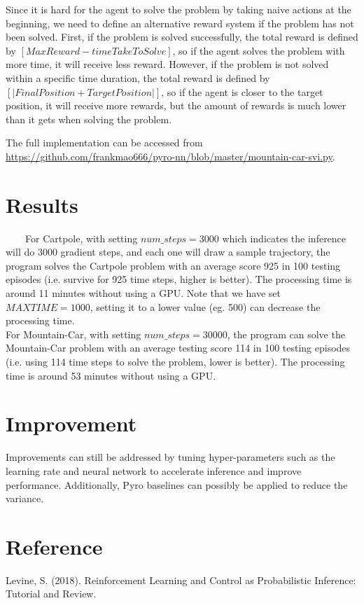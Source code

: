 \documentclass[acmsmall,nonacm=true]{acmart}
\begin{document}
Since it is hard for the agent to solve the problem by taking naive actions at the beginning, we need to define an alternative reward system if the problem has not been solved. First, if the problem is solved successfully, the total reward is defined by $[MaxReward - timeTakeToSolve]$, so if the agent solves the problem with more time, it will receive less reward. However, if the problem is not solved within a specific time duration, the total reward is defined by $[|FinalPosition + TargetPosition|]$, so if the agent is closer to the target position, it will receive more rewards, but the amount of rewards is much lower than it gets when solving the problem.

The full implementation can be accessed from  \url{https://github.com/frankmao666/pyro-nn/blob/master/mountain-car-svi.py}.
\section{Results}

\ \ \ \ For Cartpole, with setting 
$num\_steps = 3000$
which indicates the inference will do 3000 gradient steps, and each one will draw a sample trajectory, the program solves the Cartpole problem with an average  score 925 in 100 testing episodes (i.e. survive for 925 time steps, higher is better). The processing time is around 11 minutes without using a GPU. Note that we have set $MAXTIME = 1000$, setting it to a lower value (eg. 500) can decrease the processing time. \\


For Mountain-Car, with setting 
$num\_steps = 30000$,
the program can solve the Mountain-Car problem with an average testing score 114 in 100 testing episodes (i.e. using 114 time steps to solve the problem, lower is better). The processing time is around 53 minutes without using a GPU.

\section{Improvement}

Improvements can still be addressed by tuning  hyper-parameters such as the learning rate and  neural network to accelerate inference and improve performance. Additionally, Pyro baselines can possibly be applied to reduce the variance. 

\section{Reference}
Levine, S. (2018). Reinforcement Learning and Control as Probabilistic
Inference: Tutorial and Review.
\end{document}
